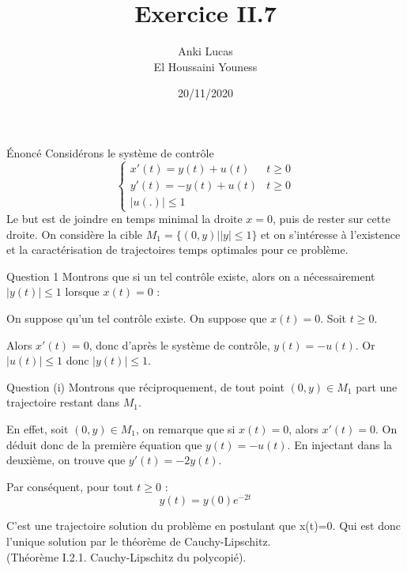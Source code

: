 \documentclass[11pt]{beamer}
\author{Anki Lucas \\ El Houssaini Youness}
\title{Exercice II.7}
\institute{Contrôle Optimal}
\date{20/11/2020}
\begin{document}
\begin{frame}
\titlepage
\end{frame}

\begin{frame}{Énoncé}
Considérons le système de contrôle 
$$
\left\{
\begin{array}{ll}
x'(t) = y(t)+u(t) & t\geq 0\\
y'(t) = -y(t)+u(t) & t\geq 0\\
|u(.)| \leq 1
\end{array}
\right.
$$
Le but est de joindre en temps minimal la droite $x=0$, puis de rester sur cette droite.
On considère la cible $M_1=\{(0,y)| |y|\leq 1\}$ et on s'intéresse à l'existence et la caractérisation de trajectoires temps optimales pour ce problème.
\end{frame}

\begin{frame}{Question 1}
Montrons que si un tel contrôle existe, alors on a nécessairement $|y(t)|\leq 1$ lorsque $x(t)=0$ :\newline

On suppose qu'un tel contrôle existe. On suppose que $x(t)=0$. Soit $t\geq 0$.\newline

Alors $x'(t)=0$, donc d'après le système de contrôle, $y(t)=-u(t)$.
Or $|u(t)| \leq 1$ donc $|y(t)|\leq 1$.
\end{frame}

\begin{frame}{Question (i)}
Montrons que réciproquement, de tout point $(0,y)\in M_1$ part une trajectoire restant dans $M_1$.\newline

En effet, soit $(0,y) \in M_1$, on remarque que si $x(t)=0$, alors $x'(t)=0$.\newline
On déduit donc de la première équation que $y(t)=-u(t)$.\newline
En injectant dans la deuxième, on trouve que $y'(t)=-2y(t)$.\newline

Par conséquent, pour tout $t\geq 0$ :
\begin{equation}
y(t)=y(0)e^{-2t}
\end{equation}

C'est une trajectoire solution du problème en postulant que x(t)=0. Qui est donc l'unique solution par  le théorème de Cauchy-Lipschitz.\\ (Théorème I.2.1. Cauchy-Lipschitz du polycopié).  
\end{frame}
\end{document}

